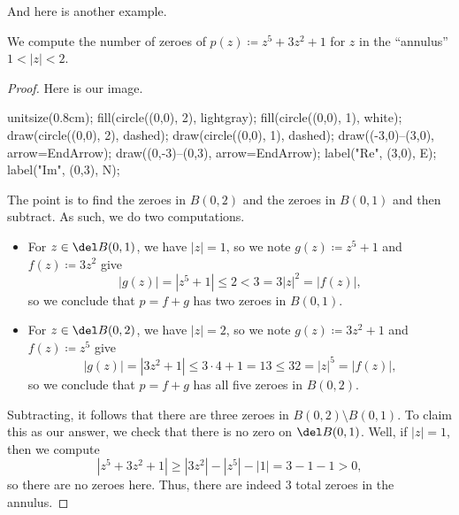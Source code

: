 And here is another example.
\begin{exe}
	We compute the number of zeroes of $p(z)\coloneqq z^5+3z^2+1$ for $z$ in the ``annulus'' $1<|z|<2$.
\end{exe}
\begin{proof}
	Here is our image.
	\begin{center}
		\begin{asy}
			unitsize(0.8cm);
			fill(circle((0,0), 2), lightgray);
			fill(circle((0,0), 1), white);
			draw(circle((0,0), 2), dashed);
			draw(circle((0,0), 1), dashed);
			draw((-3,0)--(3,0), arrow=EndArrow);
			draw((0,-3)--(0,3), arrow=EndArrow);
			label("$\textrm{Re}$", (3,0), E);
			label("$\textrm{Im}$", (0,3), N);
		\end{asy}
	\end{center}
	The point is to find the zeroes in $B(0,2)$ and the zeroes in $B(0,1)$ and then subtract. As such, we do two computations.
	\begin{itemize}
		\item For $z\in\del B(0,1)$, we have $|z|=1$, so we note $g(z)\coloneqq z^5+1$ and $f(z)\coloneqq 3z^2$ give
		\[|g(z)|=\left|z^5+1\right|\le2<3=3|z|^2=|f(z)|,\]
		so we conclude that $p=f+g$ has two zeroes in $B(0,1)$.
		\item For $z\in\del B(0,2)$, we have $|z|=2$, so we note $g(z)\coloneqq 3z^2+1$ and $f(z)\coloneqq z^5$ give
		\[|g(z)|=\left|3z^2+1\right|\le3\cdot4+1=13\le32=|z|^5=|f(z)|,\]
		so we conclude that $p=f+g$ has all five zeroes in $B(0,2)$.
	\end{itemize}
	Subtracting, it follows that there are three zeroes in $B(0,2)\setminus B(0,1)$. To claim this as our answer, we check that there is no zero on $\del B(0,1)$. Well, if $|z|=1$, then we compute
	\[\left|z^5+3z^2+1\right|\ge\left|3z^2\right|-\left|z^5\right|-|1|=3-1-1>0,\]
	so there are no zeroes here. Thus, there are indeed $\boxed3$ total zeroes in the annulus.
\end{proof}


